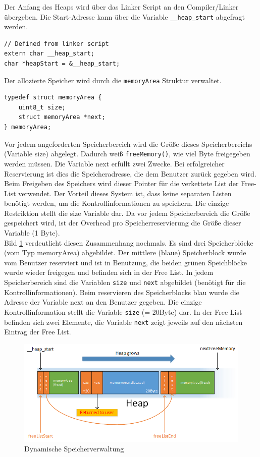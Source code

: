 \documentclass[fontsize=12pt, toc=bibliography, notitlepage]{scrreprt}
\begin{document}
Der Anfang des Heaps wird über das Linker Script an den Compiler/Linker übergeben. Die Start-Adresse kann über die Variable \lstinline$__heap_start$ abgefragt werden.

\begin{lstlisting}[title=memory.c]
// Defined from linker script
extern char __heap_start;
char *heapStart = &__heap_start;
\end{lstlisting}

Der allozierte Speicher wird durch die \lstinline$memoryArea$ Struktur verwaltet. 

\begin{lstlisting}[title=memory.c]
typedef struct memoryArea {
    uint8_t size;
    struct memoryArea *next;
} memoryArea;
\end{lstlisting}

Vor jedem angeforderten Speicherbereich wird die Größe dieses Speicherbereichs (Variable size) abgelegt. Dadurch weiß \lstinline$freeMemory()$, wie viel Byte freigegeben werden müssen. Die Variable next erfüllt zwei Zwecke. Bei erfolgreicher Reservierung ist dies die Speicheradresse, die dem Benutzer zurück gegeben wird. Beim Freigeben des Speichers wird dieser Pointer für die verkettete List der Free-List verwendet. Der Vorteil dieses System ist, dass keine separaten Listen benötigt werden, um die Kontrollinformationen zu speichern. Die einzige Restriktion stellt die size Variable dar. Da vor jedem Speicherbereich die Größe gespeichert wird, ist der Overhead pro Speicherreservierung die Größe dieser Variable (1 Byte). \\

Bild \ref{fig:memory} verdeutlicht diesen Zusammenhang nochmals. Es sind drei Speicherblöcke (vom Typ memoryArea) abgebildet. Der mittlere (blaue) Speicherblock wurde vom Benutzer reserviert und ist in Benutzung, die beiden grünen Speichblöcke wurde wieder freigegen und befinden sich in der Free List. In jedem Speicherbereich sind die Variablen \lstinline$size$ und \lstinline$next$ abgebildet (benötigt für die Kontrollinformationen). Beim reservieren des Speicherblocks blau wurde die Adresse der Variable next an den Benutzer gegeben. Die einzige Kontrollinformation stellt die Variable \lstinline$size$ (= 20Byte) dar. In der Free List befinden sich zwei Elemente, die Variable \lstinline$next$ zeigt jeweils auf den nächsten Eintrag der Free List.

\begin{figure}[H]
	\centering
	\includegraphics[width=450px]{images/memory.png}
	\caption{Dynamische Speicherverwaltung}
	\label{fig:memory}
\end{figure}
\end{document}
